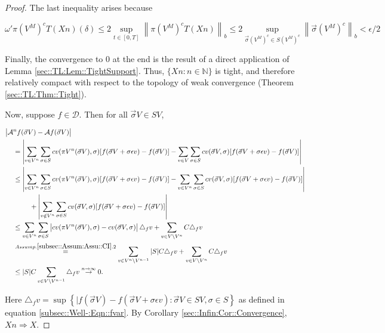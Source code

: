 \documentclass[12pt]{article}
\newcommand{\mb}{\mathbb}
\newcommand{\mc}{\mathcal}
\newcommand{\ra}{\rightarrow}
\newcommand{\os}{\overset}
\newcommand{\ep}{\epsilon}
\newcommand{\ind}{\hspace{24pt}}
\renewcommand{\v}{v}							%
\renewcommand{\S}{S}							%
\newcommand{\s}{\sigma}							%
\newcommand{\sv}{\vec{\s}}						%
\renewcommand{\b}{b}							%
\newcommand{\ev}{\ep}							%
\newcommand{\T}{T}								%
\renewcommand{\t}{t}							%
\newcommand{\proj}{\pi}							%
\newcommand{\X}{X}								%
\newcommand{\IG}{\mc{A}}						%
\newcommand{\IGr}{c}							%
\newcommand{\f}{f}								%
\newcommand{\const}{C}							%
\newcommand{\sln}[1]{^{#1}}						%
\newcommand{\core}{\mc{D}}						%
\newcommand{\delt}{\triangle}					%
\newcommand{\cconst}{M}							%
\newcommand{\cmodu}{\omega'}					%
\newcommand{\deltf}[1]{_{#1}}					%
\begin{document}
\begin{proof}
The last inequality arises because

\[\cmodu{\proj{\left(V\sln{\cconst}\right)^c}{\T}(\X{}{}{n})}(\delta) \leq 2 \sup_{\t\in [0,\T]} \left\|\proj{\left(V\sln{\cconst}\right)^c}{\T}(\X{}{}{n})\right\|_{\b{}} \leq 2 \sup_{\sv{}{\left(V\sln{\cconst}\right)^c} \in \S{\left(V\sln{\cconst}\right)^c}} \left\|\sv{}{\left(V\sln{\cconst}\right)^c}\right\|_{\b{}} < \ep/2\]

Finally, the convergence to 0 at the end is the result of a direct application of Lemma \ref{sec::TL:Lem::TightSupport}. Thus, \(\{\X{}{}{n}:n\in \mb{N}\}\) is tight, and therefore relatively compact with respect to the topology of weak convergence (Theorem \ref{sec::TL:Thm::Tight}).

Now, suppose \(f\in \core\). Then for all \(\sv{}{V} \in \S{V}\),

\begin{align*}
\big|\IG&\sln{n}f(\sv{}{V}) - \IG f(\sv{}{V})\big|\\
&= \left|\sum_{\v \in V\sln{n}} \sum_{\s \in \S} \IGr{\v}(\proj{V\sln{n}}{}(\sv{}{V}),\s)[f(\sv{}{V}+\s\ev{\v}) - f(\sv{}{V})] - \sum_{\v \in V}\sum_{\s \in \S} \IGr{\v}(\sv{}{V},\s)[f(\sv{}{V}+\s\ev{\v}) - f(\sv{}{V})]\right|\\
&\leq  \left|\sum_{\v \in V\sln{n}} \sum_{\s \in \S} \IGr{\v}(\proj{V\sln{n}}{}(\sv{}{V}),\s)[f(\sv{}{V}+\s\ev{\v}) - f(\sv{}{V})] - \sum_{\v \in V\sln{n}}\sum_{\s \in \S} \IGr{\v}(\sv{}{V},\s)[f(\sv{}{V}+\s\ev{\v}) - f(\sv{}{V})]\right|\\
&\ind  +\left|\sum_{\v \notin V\sln{n}} \sum_{\s\in \S} \IGr{\v}(\sv{}{V},\s)[f(\sv{}{V}+\s\ev{\v}) - f(\sv{}{V})]\right|\\
&\leq \sum_{\v \in V\sln{n}}\sum_{\s \in \S} \left|\IGr{\v}(\proj{V\sln{n}}{}(\sv{}{V}),\s) - \IGr{\v}(\sv{}{V},\s)\right|\delt\deltf{\f}{\v} + \sum_{\v \in V\setminus V\sln{n}} \const{}\delt\deltf{\f}{\v}\\
&\os{Assump. \ref{subsec::Assum:Assu::CI}.2}{=} \sum_{\v \in V\sln{n}\setminus V\sln{n-1}} |\S|\const{} \delt\deltf{\f}{\v} + \sum_{\v \in V\setminus V\sln{n}} \const{}\delt\deltf{\f}{\v}\\
&\leq |\S|C\sum_{\v \in V\setminus V\sln{n-1}} \delt\deltf{\f}{\v} \os{n\ra\infty}{\ra} 0.
\end{align*}

Here \(\delt\deltf{\f}{\v} = \sup\left\{|f(\sv{}{V}) - f(\sv{}{V} + \s\ev{\v}): \sv{}{V}\in \S{V},\s \in \S\right\}\) as defined in equation \eqref{subsec::Well-:Eqn::fvar}. By Corollary \ref{sec::Infin:Cor::Convergence}, \(\X{}{}{n}\Rightarrow \X{}{}\).
\end{proof}
\end{document}
